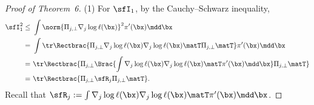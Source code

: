 \documentclass[11pt]{article}
\begin{document}
\begin{proof}[Proof of Theorem~6]
\noindent
(1) For $\sfI_1$, by the Cauchy--Schwarz inequality,
\begin{equation}
\label{eqn:pf_LLIS_I1}
\begin{split}
    \sfI_1^2 \le~& \int \norm{ \Pi_{j,\bot} \nabla_j \log \ell (\bx) }^2 \pi'(\bx) \mdd \bx \\
    =~& \int \tr \Rectbrac{  \Pi_{j,\bot} \nabla_j \log \ell (\bx) \nabla_j \log \ell(\bx) \matT \Pi_{j,\bot}\matT } \pi'(\bx) \mdd \bx \\
    =~& \tr \Rectbrac{ \Pi_{j,\bot} \Brac{  \int \nabla_j \log \ell(\bx) \nabla_j \log \ell(\bx) \matT \pi'(\bx) \mdd \bx } \Pi_{j,\bot}\matT } \\
    =~& \tr \Rectbrac{ \Pi_{j,\bot} \sfR_j \Pi_{j,\bot}\matT }.
\end{split}
\end{equation}
Recall that $\sfR_j := \int \nabla_j \log \ell(\bx) \nabla_j \log \ell(\bx) \matT \pi'(\bx) \mdd \bx$.


\end{proof}
\end{document}

